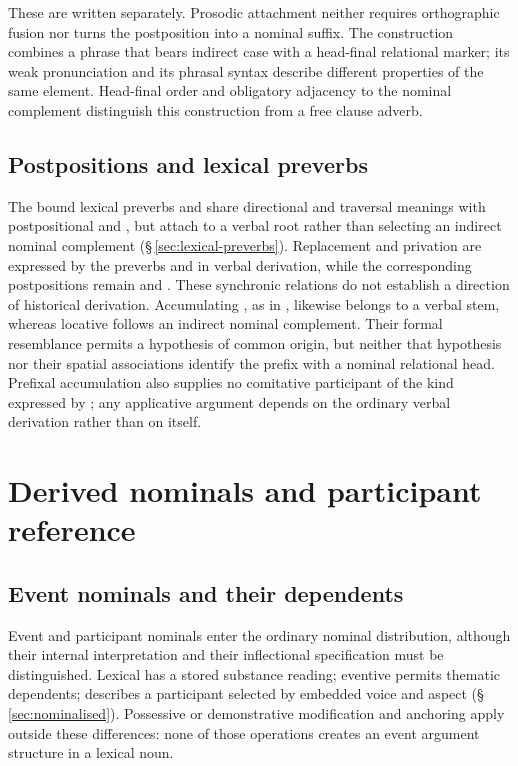 These  are written separately. Prosodic
attachment neither requires orthographic fusion nor turns the postposition into
a nominal suffix. The construction combines a phrase that bears indirect case
with a head-final relational marker; its weak pronunciation and its phrasal
syntax describe different properties of the same element.
Head-final order and obligatory adjacency to the nominal complement distinguish
this construction from a free clause adverb.

\subsection{Postpositions and lexical preverbs}
\label{sec:nm-postp-preverbs}

The bound lexical preverbs  and  share directional and
traversal meanings with postpositional  and , but attach
to a verbal root rather than selecting an indirect nominal complement
(§\,\ref{sec:lexical-preverbs}). Replacement and privation are expressed
by the preverbs  and  in verbal derivation, while the
corresponding postpositions remain  and . These
synchronic relations do not establish a direction of historical derivation.
Accumulating , as in  , likewise belongs to a verbal stem, whereas locative
 follows an indirect nominal complement. Their formal resemblance
permits a hypothesis of common origin, but neither that hypothesis nor their
spatial associations identify the prefix with a nominal relational head.
Prefixal accumulation also supplies no comitative participant of the kind
expressed by ; any applicative argument depends on the ordinary
verbal derivation rather than on  itself.

\FloatBarrier

\section{Derived nominals and participant reference}
\label{sec:nm-derived}

\subsection{Event nominals and their dependents}
\label{sec:nm-derived-event}
\label{sec:nm-derived-gerund}

Event and participant nominals enter the ordinary nominal distribution,
although their internal interpretation and their inflectional specification
must be distinguished. Lexical   has a stored
substance reading; eventive   permits thematic
dependents;   describes a participant
selected by embedded voice and aspect (§\,\ref{sec:nominalised}). Possessive
or demonstrative modification and anchoring apply outside these differences:
none of those operations creates an event argument structure in a lexical noun.

